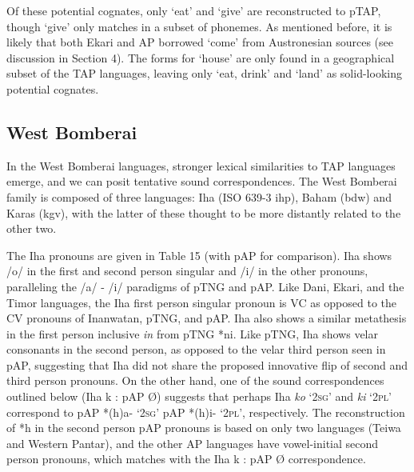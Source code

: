 Of these potential cognates, only `eat' and `give' are reconstructed to pTAP, though `give' only matches in a subset of phonemes. As mentioned before, it is likely that both Ekari and AP borrowed `come' from Austronesian sources (see discussion in Section 4). The forms for `house' are only found in a geographical subset of the TAP languages, leaving only `eat, drink' and `land' as solid-looking potential cognates.

\subsection{West Bomberai }
In the West Bomberai languages, stronger lexical similarities to TAP languages emerge, and we can posit tentative sound correspondences. The West Bomberai family is composed of three languages: Iha (ISO 639-3 ihp), Baham (bdw) and Karas (kgv), with the latter of these thought to be more distantly related to the other two.

The Iha pronouns are given in Table 15 (with pAP for comparison). Iha shows /o/ in the first and second person singular and /i/ in the other pronouns, paralleling the /a/ - /i/ paradigms of pTNG and pAP. Like Dani, Ekari, and the Timor languages, the Iha first person singular pronoun is VC as opposed to the CV pronouns of Inanwatan, pTNG, and pAP. Iha also shows a similar metathesis in the first person inclusive \textit{in} from pTNG *ni. Like pTNG, Iha shows velar consonants in the second person, as opposed to the velar third person seen in pAP, suggesting that Iha did not share the proposed innovative flip of second and third person pronouns. On the other hand, one of the sound correspondences outlined below (Iha k : pAP {\O}) suggests that perhaps Iha \textit{ko} `\textsc{2sg}' and \textit{ki} `\textsc{2pl}' correspond to pAP *(h)a- `\textsc{2sg}' pAP *(h)i- `\textsc{2pl}', respectively. The reconstruction of *h in the second person pAP pronouns is based on only two languages (Teiwa and Western Pantar),
and the other AP languages have vowel-initial second person pronouns, which matches with the Iha k : pAP {\O} correspondence.


